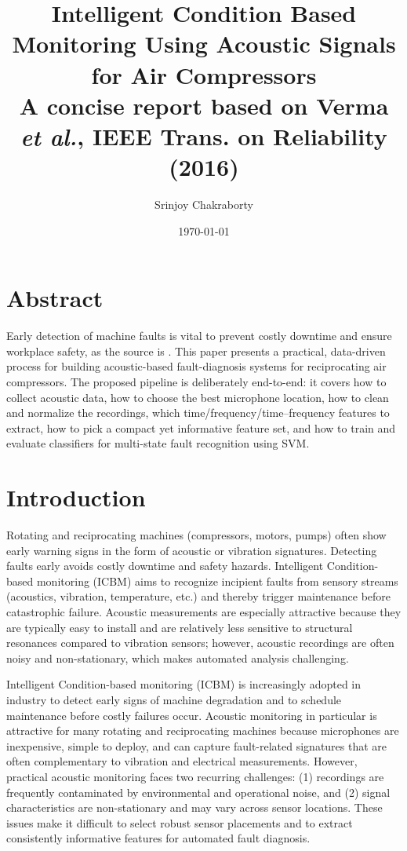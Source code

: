 \documentclass[12pt,a4paper]{article}
\title{Intelligent Condition Based Monitoring Using
Acoustic Signals for Air Compressors\\
\vspace{6pt}
\large A concise report based on Verma \textit{et al.}, IEEE Trans. on Reliability (2016)}
\author{Srinjoy Chakraborty}
\date{\today}
\begin{document}
\maketitle %
\newpage
\tableofcontents %
\listoffigures %
\newpage
\begin{multicols}{2}
\section{Abstract}
Early detection of machine faults is vital to prevent costly downtime and ensure workplace safety, as the source is \cite{Verma2016}. This paper presents a practical, data-driven process for building acoustic-based fault-diagnosis systems for reciprocating air compressors. The proposed pipeline is deliberately end-to-end: it covers how to collect acoustic data, how to choose the best microphone location, how to clean and normalize the recordings, which time/frequency/time–frequency features to extract, how to pick a compact yet informative feature set, and how to train and evaluate classifiers for multi-state fault recognition using SVM.
\section{Introduction}
Rotating and reciprocating machines (compressors, motors, pumps) often show early warning signs in the form of acoustic or vibration signatures. Detecting faults early avoids costly downtime and safety hazards. Intelligent Condition-based monitoring (ICBM) aims to recognize incipient faults from sensory streams (acoustics, vibration, temperature, etc.) and thereby trigger maintenance before catastrophic failure. Acoustic measurements are especially attractive because they are typically easy to install and are relatively less sensitive to structural resonances compared to vibration sensors; however, acoustic recordings are often noisy and non-stationary, which makes automated analysis challenging.

Intelligent Condition-based monitoring (ICBM) is increasingly adopted in industry to detect early signs of machine degradation and to schedule maintenance before costly failures occur. Acoustic monitoring in particular is attractive for many rotating and reciprocating machines because microphones are inexpensive, simple to deploy, and can capture fault-related signatures that are often complementary to vibration and electrical measurements. However, practical acoustic monitoring faces two recurring challenges: (1) recordings are frequently contaminated by environmental and operational noise, and (2) signal characteristics are non-stationary and may vary across sensor locations. These issues make it difficult to select robust sensor placements and to extract consistently informative features for automated fault diagnosis.


\end{multicols}
\end{document}
